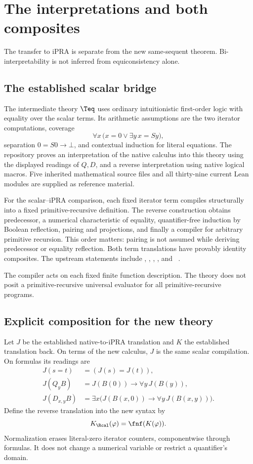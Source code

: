 \section{The interpretations and both composites}
\label{sec:interpretations}

The transfer to iPRA is separate from the new same-sequent theorem.
Bi-interpretability is not inferred from equiconsistency alone.

\subsection{The established scalar bridge}

The intermediate theory \(\Teq\) uses ordinary intuitionistic first-order
logic with equality over the scalar terms. Its arithmetic assumptions are
the two iterator computations, coverage
\[
  \forall x\,\bigl(x=0\lor\exists y\,x=Sy\bigr),
\]
separation \(0=S0\to\bot\), and contextual induction for literal
equations. The repository proves an interpretation of the native
calculus into this theory using the displayed readings of \(Q,D\),
and a reverse interpretation using native logical macros.
Five inherited mathematical source files and all thirty-nine current
Lean modules are supplied as reference material.

For the scalar--iPRA comparison, each fixed iterator term compiles
structurally into a fixed primitive-recursive definition. The reverse
construction obtains predecessor, a numerical characteristic of equality,
quantifier-free induction by Boolean reflection, pairing and projections,
and finally a compiler for arbitrary primitive recursion. This order
matters: pairing is not assumed while deriving predecessor or equality
reflection. Both term translations have provably identity composites.
The upstream statements include
, , ,
, and
~\cite{bridge}.

The compiler acts on each fixed finite function description. The theory
does not posit a primitive-recursive universal evaluator for all
primitive-recursive programs.

\subsection{Explicit composition for the new theory}

Let \(J\) be the established native-to-iPRA translation and \(K\) the
established translation back. On terms of the new calculus, \(J\)
is the same scalar compilation. On formulas its readings are
\begin{align*}
 J(s=t)&=(J(s)=J(t)),\\
 J(Q_yB)&=J(B(0))\to\forall y\,J(B(y)),\\
 J(D_{x,y}B)&=\exists x\bigl(J(B(x,0))\to
                          \forall y\,J(B(x,y))\bigr).
\end{align*}
Define the reverse translation into the new syntax by
\[
                         K_{\Rcal}(\varphi)=\fnf(K(\varphi)).
\]
Normalization erases literal-zero iterator counters, componentwise
through formulas. It does not change a numerical variable or restrict
a quantifier's domain.

